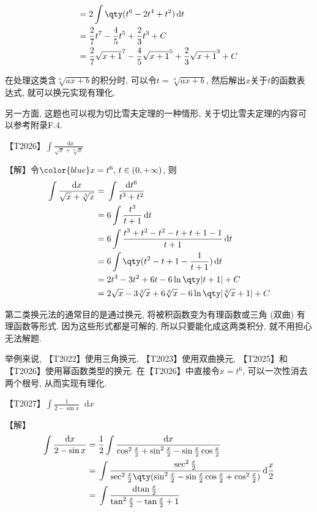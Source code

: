 \documentclass{ctexbook}
\newcommand*{\dif}{\mathop{}\!\mathrm{d}}
\begin{document}
{\begin{align*}
={}&2\int\qty(t^{6}-2t^{4}+t^{2})\dif{t}\\
={}&\frac{2}{7}t^{7}-\frac{4}{5}t^{5}+\frac{2}{3}t^{3}+C\\
={}&\frac{2}{7}\sqrt{x+1}^{7}-\frac{4}{5}\sqrt{x+1}^{5}+\frac{2}{3}\sqrt{x+1}^{3}+C
\end{align*}\par
{\kaishu 在处理这类含$\sqrt[n]{ax+b}$的积分时, 可以令$t=\sqrt[n]{ax+b}$, 然后解出$x$关于$t$的函数表达式, 就可以换元实现有理化. \par
另一方面, 这题也可以视为切比雪夫定理的一种情形, 关于切比雪夫定理的内容可以参考附录F.4. \par}
{\color{red}【T2026】}$\int\frac{\dif{x}}{\sqrt{x}+\sqrt[3]{x}}$\par
【解】令$\color{blue}x=t^{6},\,t\in\left(0,+\infty\right)$, 则
\begin{align*}
\int\frac{\dif{x}}{\sqrt{x}+\sqrt[3]{x}}={}&\int\frac{\dif{t^{6}}}{t^{3}+t^{2}}\\
={}&6\int\frac{t^{3}}{t+1}\dif{t}\\
={}&6\int\frac{t^{3}+t^{2}-t^{2}-t+t+1-1}{t+1}\dif{t}\\
={}&6\int\qty(t^{2}-t+1-\frac{1}{t+1})\dif{t}\\
={}&2t^{3}-3t^{2}+6t-6\ln\qty|t+1|+C\\
={}&2\sqrt{x}-3\sqrt[3]{x}+6\sqrt[6]{x}-6\ln\qty|\sqrt[6]{x}+1|+C
\end{align*}\par
{\kaishu 第二类换元法的通常目的是通过换元, 将被积函数变为有理函数或三角 (双曲) 有理函数等形式. 因为这些形式都是可解的, 所以只要能化成这两类积分, 就不用担心无法解题. \par
举例来说, {\color{red}【T2022】}使用三角换元, {\color{red}【T2023】}使用双曲换元, {\color{red}【T2025】}和{\color{red}【T2026】}使用幂函数类型的换元. 在{\color{red}【T2026】}中直接令$x=t^{6}$, 可以一次性消去两个根号, 从而实现有理化. \par}
{\color{red}【T2027】}$\int\frac{1}{2-\sin{x}}\dif{x}$\par
【解】
\begin{align*}
\int\frac{\dif{x}}{2-\sin{x}}={}&\frac{1}{2}\int\frac{\dif{x}}{\cos^{2}{\frac{x}{2}}+\sin^{2}{\frac{x}{2}}-\sin{\frac{x}{2}}\cos{\frac{x}{2}}}\\
={}&\int\frac{\sec^{2}{\frac{x}{2}}}{\sec^{2}{\frac{x}{2}}\qty(\sin^{2}{\frac{x}{2}}-\sin{\frac{x}{2}}\cos{\frac{x}{2}}+\cos^{2}{\frac{x}{2}})}\dif{\frac{x}{2}}\\
={}&\int\frac{\dif{\tan{\frac{x}{2}}}}{\tan^{2}{\frac{x}{2}}-\tan{\frac{x}{2}}+1}\\

\end{align*}}
\end{document}
